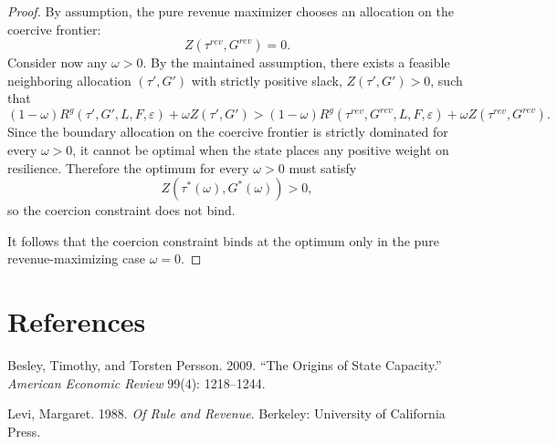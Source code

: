 \documentclass[12pt]{article}
\begin{document}
\begin{proof}
By assumption, the pure revenue maximizer chooses an allocation on the coercive frontier:
\begin{equation}
Z(\tau^{rev},G^{rev})=0.
\end{equation}
Consider now any $\omega>0$. By the maintained assumption, there exists a feasible neighboring allocation $(\tau',G')$ with strictly positive slack, $Z(\tau',G')>0$, such that
\begin{equation}
(1-\omega)R^g(\tau',G',L,F,\varepsilon)+\omega Z(\tau',G')
>
(1-\omega)R^g(\tau^{rev},G^{rev},L,F,\varepsilon)+\omega Z(\tau^{rev},G^{rev}).
\end{equation}
Since the boundary allocation on the coercive frontier is strictly dominated for every $\omega>0$, it cannot be optimal when the state places any positive weight on resilience. Therefore the optimum for every $\omega>0$ must satisfy
\begin{equation}
Z(\tau^*(\omega),G^*(\omega))>0,
\end{equation}
so the coercion constraint does not bind.

It follows that the coercion constraint binds at the optimum only in the pure revenue-maximizing case $\omega=0$.
\end{proof}

\section*{References}

Besley, Timothy, and Torsten Persson. 2009. ``The Origins of State Capacity.'' \emph{American Economic Review} 99(4): 1218--1244.

Levi, Margaret. 1988. \emph{Of Rule and Revenue}. Berkeley: University of California Press.
\end{document}
